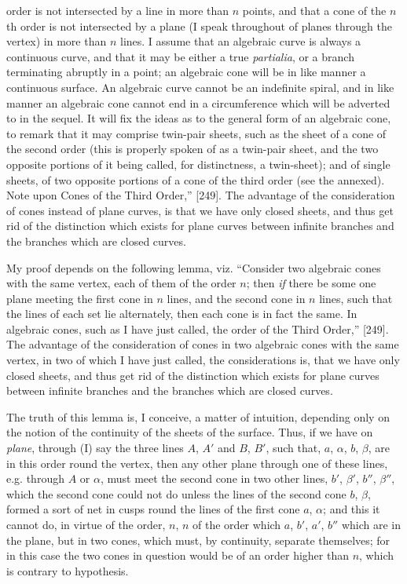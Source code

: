 \documentclass[11pt,a4paper]{book}
\begin{document}
order is not intersected by a line in more than $n$ points, and that a cone of the $n$th order is not intersected by a plane (I speak throughout of planes through the vertex) in more than $n$ lines. I assume that an algebraic curve is always a continuous curve, and that it may be either a true \textit{partialia}, or a branch terminating abruptly in a point; an algebraic cone will be in like manner a continuous surface. An algebraic curve cannot be an indefinite spiral, and in like manner an algebraic cone cannot end in a circumference which will be adverted to in the sequel. It will fix the ideas as to the general form of an algebraic cone, to remark that it may comprise twin-pair sheets, such as the sheet of a cone of the second order (this is properly spoken of as a twin-pair sheet, and the two opposite portions of it being called, for distinctness, a twin-sheet); and of single sheets, of two opposite portions of a cone of the third order (see the annexed). Note upon Cones of the Third Order,'' [249]. The advantage of the consideration of cones instead of plane curves, is that we have only closed sheets, and thus get rid of the distinction which exists for plane curves between infinite branches and the branches which are closed curves.

My proof depends on the following lemma, viz. ``Consider two algebraic cones with the same vertex, each of them of the order $n$; then \textit{if} there be some one plane meeting the first cone in $n$ lines, and the second cone in $n$ lines, such that the lines of each set lie alternately, then each cone is in fact the same. In algebraic cones, such as I have just called, the order of the Third Order,'' [249]. The advantage of the consideration of cones in two algebraic cones with the same vertex, in two of which I have just called, the considerations is, that we have only closed sheets, and thus get rid of the distinction which exists for plane curves between infinite branches and the branches which are closed curves.

The truth of this lemma is, I conceive, a matter of intuition, depending only on the notion of the continuity of the sheets of the surface. Thus, if we have on \textit{plane}, through (I) say the three lines $A$, $A'$ and $B$, $B'$, such that, $a$, $\alpha$, $b$, $\beta$, are in this order round the vertex, then any other plane through one of these lines, e.g. through $A$ or $\alpha$, must meet the second cone in two other lines, $b'$, $\beta'$, $b''$, $\beta''$, which the second cone could not do unless the lines of the second cone $b$, $\beta$, formed a sort of net in cusps round the lines of the first cone $a$, $\alpha$; and this it cannot do, in virtue of the order, $n$, $n$ of the order which $a$, $b'$, $a'$, $b''$ which are in the plane, but in two cones, which must, by continuity, separate themselves; for in this case the two cones in question would be of an order higher than $n$, which is contrary to hypothesis.
\end{document}

